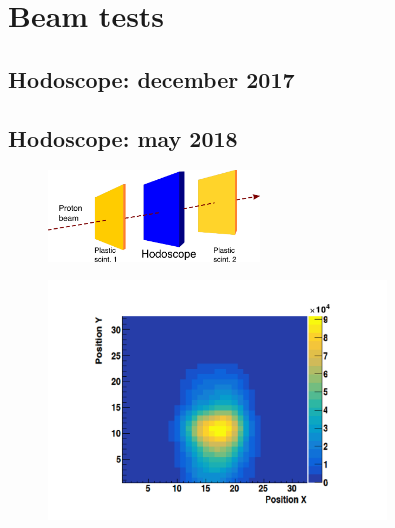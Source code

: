 \chapter{Beam tests}\label{chap::6}

\vfill

\minitoc

\newpage

\glsresetall
{} 





\section{Hodoscope: december 2017}

\section{Hodoscope: may 2018}


\begin{figure}[!htbp]
\centering
\includegraphics[width=0.5\textwidth]{03_GraphicFiles/chapter6_BeamTests/Nice_May2018/scheme.png}
\caption{}
\label{chap6::fig::May_HodoDAQscheme}
\end{figure}

\begin{figure}[!htbp]
\centering
\includegraphics[width=0.8\textwidth]{03_GraphicFiles/chapter6_BeamTests/Nice_May2018/map2D.pdf}
\caption{}
\label{chap6::fig::May_HodoMap2D}
\end{figure}


